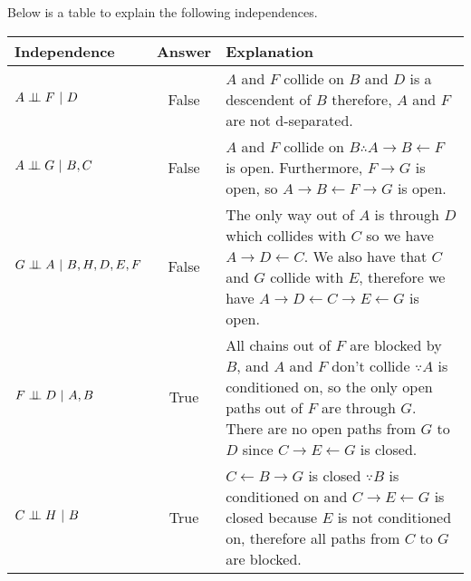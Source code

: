 Below is a table to explain the following independences.

\begin{tabular}{|l|c|p{7.75cm}|}
    \hline
    \textbf{Independence} & \textbf{Answer} & \textbf{Explanation}\\
    \hline\hline
    $A \perp\!\!\!\perp F ~\vert~ D$ & False & $A$ and $F$ collide on $B$ and $D$ is a descendent of $B$ therefore, $A$ and $F$ are not d-separated.\\
    \hline
    $A \perp\!\!\!\perp G ~\vert~ B,C$ & False & $A$ and $F$ collide on $B \therefore A \rightarrow B \leftarrow F$ is open. Furthermore, $F \rightarrow G$ is open, so $A \rightarrow B \leftarrow F \rightarrow G $ is open.\\
    \hline
    $G \perp\!\!\!\perp A ~\vert~ B, H, D, E, F$ & False & The only way out of $A$ is through $D$ which collides with $C$ so we have $A \rightarrow D \leftarrow C$. We also have that $C$ and $G$ collide with $E$, therefore we have $A \rightarrow D \leftarrow C \rightarrow E \leftarrow G$ is open.  \\
    \hline
    $F \perp\!\!\!\perp D ~\vert~ A, B$ & True & All chains out of $F$ are blocked by $B$, and $A$ and $F$ don't collide $\because A$ is conditioned on, so the only open paths out of $F$ are through $G$. There are no open paths from $G$ to $D$ since $C \rightarrow E \leftarrow G$ is closed. \\
    \hline
    $C \perp\!\!\!\perp H ~\vert~ B$ & True & $C \leftarrow B \rightarrow G$ is closed $\because B$ is conditioned on and $C \rightarrow E \leftarrow G$ is closed because $E$ is not conditioned on, therefore all paths from $C$ to $G$ are blocked. \\
    \hline
\end{tabular}

